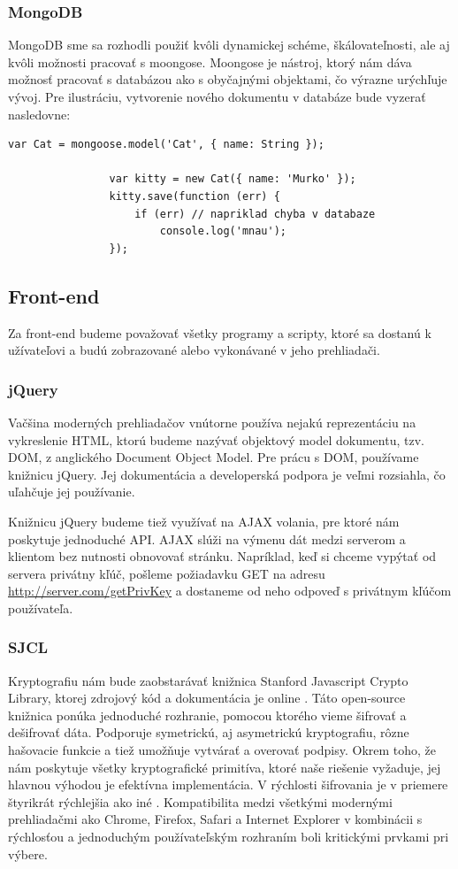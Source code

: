 		\subsubsection{MongoDB}
			MongoDB sme sa rozhodli použiť kvôli dynamickej schéme, škálovateľnosti, ale aj kvôli možnosti pracovať s moongose. Moongose je nástroj, ktorý nám dáva možnosť pracovať s databázou ako s obyčajnými objektami, čo výrazne urýchľuje vývoj. Pre ilustráciu, vytvorenie nového dokumentu v databáze bude vyzerať nasledovne:
			\medskip
			\begin{lstlisting}[caption=Vytvorenie mongoose modelu a jeho použitie]
				var Cat = mongoose.model('Cat', { name: String }); 

				var kitty = new Cat({ name: 'Murko' });
				kitty.save(function (err) {
 					if (err) // napriklad chyba v databaze
						console.log('mnau');
				});			
			\end{lstlisting}
			
		
	\subsection{Front-end}
		Za front-end budeme považovať všetky programy a scripty, ktoré sa dostanú k užívateľovi a budú zobrazované alebo vykonávané v jeho prehliadači. 
		\subsubsection{jQuery}
			Vačšina moderných prehliadačov vnútorne používa nejakú reprezentáciu na vykreslenie HTML, ktorú budeme nazývať objektový model dokumentu, tzv. DOM, z anglického Document Object Model. Pre prácu s DOM, používame knižnicu jQuery. Jej dokumentácia a developerská podpora je veľmi rozsiahla, čo uľahčuje jej používanie. 
			
		Knižnicu jQuery budeme tiež využívať na AJAX volania, pre ktoré nám poskytuje jednoduché API. AJAX slúži na výmenu dát medzi serverom a klientom bez nutnosti obnovovať stránku. Napríklad, keď si chceme vypýtať od servera privátny kľúč, pošleme požiadavku GET na adresu \url{http://server.com/getPrivKey} a dostaneme od neho odpoveď s privátnym kľúčom používateľa.
		\subsubsection{SJCL}
		Kryptografiu nám bude zaobstarávať knižnica Stanford Javascript Crypto Library, ktorej zdrojový kód a dokumentácia je online \cite{SJCLgit}. Táto open-source knižnica ponúka jednoduché rozhranie, pomocou ktorého vieme šifrovať a dešifrovať dáta. Podporuje symetrickú, aj asymetrickú kryptografiu, rôzne hašovacie funkcie a tiež umožňuje vytvárať a overovať podpisy. Okrem toho, že nám poskytuje všetky kryptografické primitíva, ktoré naše riešenie vyžaduje, jej hlavnou výhodou je efektívna implementácia. V rýchlosti šifrovania je v priemere štyrikrát rýchlejšia ako iné \cite{SJCLtext}. Kompatibilita medzi všetkými modernými prehliadačmi ako Chrome, Firefox, Safari a Internet Explorer v kombinácii s rýchlosťou a jednoduchým používateľským rozhraním boli kritickými prvkami pri výbere.



